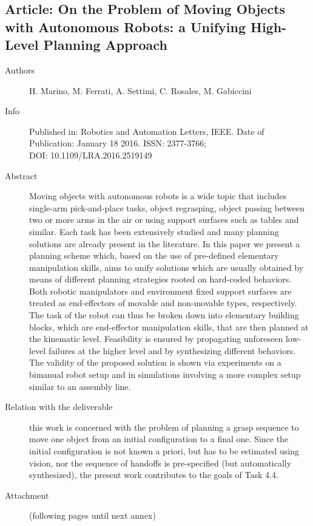\documentclass[a4paper,11pt,pdf]{pacmanreport}
\begin{document}
\subsection{Article: On the Problem of Moving Objects with Autonomous Robots: a Unifying High-Level Planning Approach} 
\label{ann:highLevelPlanning}
\begin{description}
    \item[Authors] H. Marino, M. Ferrati, A. Settimi, C. Rosales, M. Gabiccini
    \item[Info] Published in: Robotics and Automation Letters, IEEE. Date of Publication: January 18 2016. ISSN: 2377-3766;\\
         DOI: 10.1109/LRA.2016.2519149
    \item[Abstract] Moving objects with autonomous robots is a wide topic that includes single-arm pick-and-place tasks, object regrasping, object passing between two or more arms in the air or using support surfaces such as tables and similar. Each task has been extensively studied and many planning solutions are already present in the literature. In this paper we present a planning scheme which, based on the use of pre-defined elementary manipulation skills, aims to unify solutions which are usually obtained by means of different planning strategies rooted on hard-coded behaviors. Both robotic manipulators and environment fixed support surfaces are treated as end-effectors of movable and non-movable types, respectively. The task of the robot can thus be broken down into elementary building blocks, which are end-effector manipulation skills, that are then planned at the kinematic level. Feasibility is ensured by propagating unforeseen low-level failures at the higher level and by synthesizing different behaviors. The validity of the proposed solution is shown via experiments on a bimanual robot setup and in simulations involving a more complex setup similar to an assembly line.
    \item[Relation with the deliverable] this work is concerned with the problem of planning a grasp sequence to move one object from an initial configuration to a final one. Since the initial configuration is not known a priori, but has to be estimated using vision, nor the sequence of handoffs is pre-specified (but automatically synthesized), the present work contributes to the goals of Task 4.4.
    \item[Attachment] (following pages until next annex)
\end{description}

\end{document}
